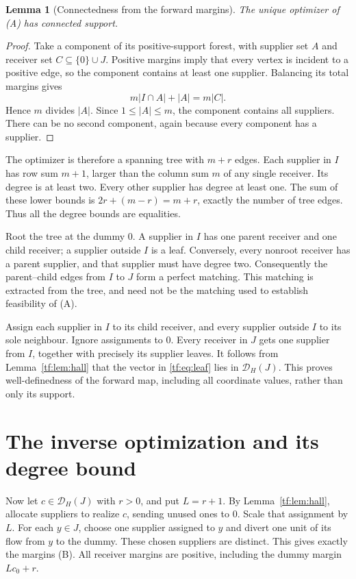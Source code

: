 \documentclass[11pt]{article}
\numberwithin{equation}{section}
\newtheorem{lemma}[theorem]{Lemma}
\theoremstyle{definition}
\newcommand{\cD}{\mathcal D}
\begin{document}
\begin{lemma}[Connectedness from the forward margins]
\label{tf:lem:Aconnected}
The unique optimizer of (A) has connected support.
\end{lemma}
\begin{proof}
Take a component of its positive-support forest, with supplier set $A$
and receiver set $C\subseteq\{0\}\cup J$. Positive margins imply that
every vertex is incident to a positive edge, so the component contains at
least one supplier. Balancing its total margins gives
\[
 m|I\cap A|+|A|=m|C|.
\]
Hence $m$ divides $|A|$. Since $1\le |A|\le m$, the component contains all
suppliers. There can be no second component, again because every component
has a supplier.
\end{proof}

The optimizer is therefore a spanning tree with $m+r$ edges. Each
supplier in $I$ has row sum $m+1$, larger than the column sum $m$ of any
single receiver. Its degree is at least two. Every other supplier has
degree at least one. The sum of these lower bounds is
$2r+(m-r)=m+r$, exactly the number of tree edges. Thus all the degree
bounds are equalities.

Root the tree at the dummy $0$. A supplier in $I$ has one parent receiver
and one child receiver; a supplier outside $I$ is a leaf. Conversely,
every nonroot receiver has a parent supplier, and that supplier must have
degree two. Consequently the parent--child edges from $I$ to $J$ form a
perfect matching. This matching is extracted from the tree, and need not
be the matching used to establish feasibility of (A).

Assign each supplier in $I$ to its child receiver, and every supplier
outside $I$ to its sole neighbour. Ignore assignments to $0$. Every
receiver in $J$ gets one supplier from $I$, together with precisely its
supplier leaves. It follows from Lemma~\ref{tf:lem:hall} that the vector
in \eqref{tf:eq:leaf} lies in $\cD_H(J)$. This proves well-definedness of
the forward map, including all coordinate values, rather than only its
support.

\section{The inverse optimization and its degree bound}
\label{tf:sec:backward}
Now let $c\in\cD_H(J)$ with $r>0$, and put $L=r+1$. By
Lemma~\ref{tf:lem:hall}, allocate suppliers to realize $c$, sending unused
ones to $0$. Scale that assignment by $L$. For each $y\in J$, choose one
supplier assigned to $y$ and divert one unit of its flow from $y$ to the
dummy. These chosen suppliers are distinct. This gives exactly the margins
(B). All receiver margins are positive, including the dummy margin
$Lc_0+r$.
\end{document}
